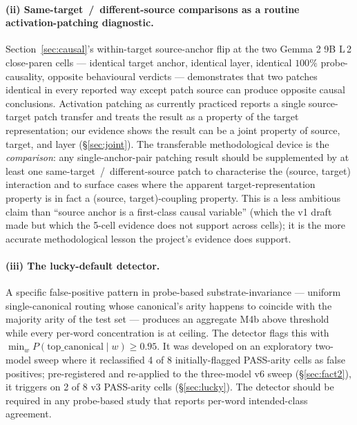 \documentclass[11pt,letterpaper]{article}
\newcommand{\Mbfb}{M4b}
\begin{document}
\paragraph{(ii) Same-target~/~different-source comparisons as a
routine activation-patching diagnostic.}
Section~\ref{sec:causal}'s within-target source-anchor flip at the
two Gemma 2 9B L\,2 close-paren cells --- identical target anchor,
identical layer, identical $100\%$ probe-causality, opposite
behavioural verdicts --- demonstrates that two patches identical in
every reported way except patch source can produce opposite causal
conclusions. Activation patching as currently practiced reports a
single source-target patch transfer and treats the result as a
property of the target representation; our evidence shows the result
can be a joint property of source, target, and layer
(\S\ref{sec:joint}). The transferable methodological device is the
\emph{comparison}: any single-anchor-pair patching result should be
supplemented by at least one same-target~/~different-source patch to
characterise the (source, target) interaction and to surface cases
where the apparent target-representation property is in fact a
(source, target)-coupling property. This is a less ambitious claim
than ``source anchor is a first-class causal variable'' (which the
v1 draft made but which the 5-cell evidence does not support across
cells); it is the more accurate methodological lesson the project's
evidence does support.

\paragraph{(iii) The lucky-default detector.} A specific
false-positive pattern in probe-based substrate-invariance ---
uniform single-canonical routing whose canonical's arity happens to
coincide with the majority arity of the test set --- produces an
aggregate \Mbfb{} above threshold while every per-word
concentration is at ceiling. The detector flags this with
$\min_w P(\text{top\_canonical} \mid w) \geq 0.95$. It was
developed on an exploratory two-model sweep where it reclassified
4 of 8 initially-flagged PASS-arity cells as false positives;
pre-registered and re-applied to the three-model v6 sweep
(\S\ref{sec:fact2}), it triggers on 2 of 8 v3 PASS-arity cells
(\S\ref{sec:lucky}). The detector should be required in any
probe-based study that reports per-word intended-class agreement.
\end{document}
